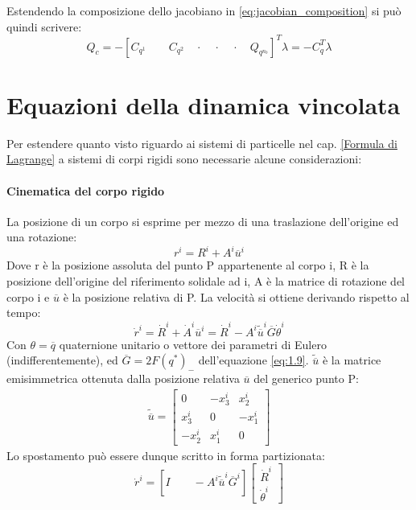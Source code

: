 Estendendo la composizione dello jacobiano in \ref{eq:jacobian_composition} si può quindi scrivere:
\begin{equation} \label{eq:reactions_result_sys}
Q_c = - \left[ C_{q^1} \qquad C_{q^2} \quad \cdot\quad\cdot\quad\cdot\quad Q_{q^{n_b}} \right]^T \lambda = -C_q^T\lambda
\end{equation}
\section{Equazioni della dinamica vincolata}
Per estendere quanto visto riguardo ai sistemi di particelle  nel cap. \ref{Formula di Lagrange} a sistemi di corpi rigidi sono necessarie alcune considerazioni:
\paragraph{Cinematica del corpo rigido}
La posizione di un corpo si esprime per mezzo di una traslazione dell'origine ed una rotazione:
\begin{equation} \label{eq:body_point_pos}
r^i = R^i + A^i\overline{u}^i
\end{equation}
Dove r è la posizione assoluta del punto P appartenente al corpo i, R è la posizione dell'origine del riferimento solidale ad i, A è la matrice di rotazione del corpo i e $\overline{u}$ è la posizione relativa di P. La velocità si ottiene derivando rispetto al tempo:
\begin{equation} \label{eq:body_point_vel}
\dot{r}^i = \dot{R}^i + \dot{A}^i\overline{u}^i = \dot{R}^i - A^i \tilde{\overline{u}}^i\overline{G}\dot{\theta}^i
\end{equation}
Con $\theta = \overline{q}$ quaternione unitario o vettore dei parametri di Eulero (indifferentemente), ed $\overline{G} = 2F(q^*)_-$ dell'equazione \ref{eq:1.9}. $\tilde{\overline{u}}$ è la matrice emisimmetrica ottenuta dalla posizione relativa $\overline{u}$ del generico punto P:
\begin{eqnarray} \tilde{\overline{u}}  = \begin{bmatrix}
0 & -x_3^i & x_2^i \\ x_3^i & 0 & -x_1^i \\ -x_2^i & x_1^i & 0 \end{bmatrix}\end{eqnarray}
Lo spostamento può essere dunque scritto in forma partizionata:
\begin{equation} \label{eq:body_point_vel_partform}
\dot{r}^i = \left[ I \qquad - A^i\tilde{\overline{u}}^i\overline{G}^i\right] \begin{bmatrix}\dot{R}^i \\ \dot{\theta}^i \end{bmatrix}  \end{equation}
